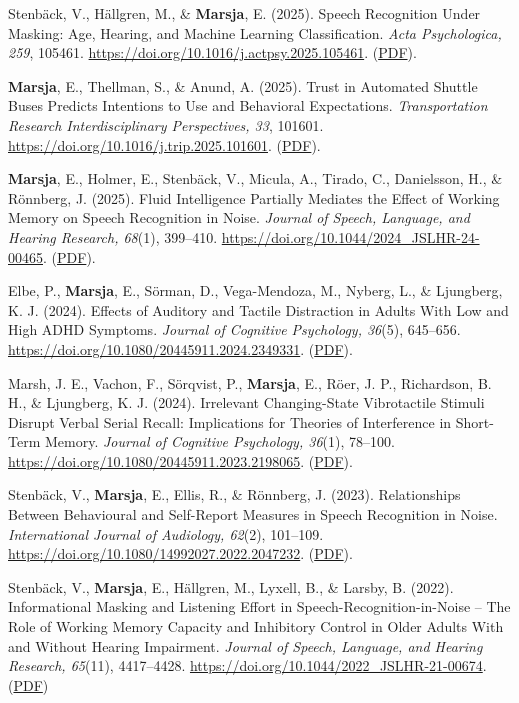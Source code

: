 \documentclass[]{article}
\begin{document}
Stenbäck, V., Hällgren, M., \& \textbf{Marsja}, E. (2025). Speech
Recognition Under Masking: Age, Hearing, and Machine Learning
Classification. \emph{Acta Psychologica, 259}, 105461.
\url{https://doi.org/10.1016/j.actpsy.2025.105461}.
(\href{https://tinyurl.com/spinml}{PDF}).

\textbf{Marsja}, E., Thellman, S., \& Anund, A. (2025). Trust in
Automated Shuttle Buses Predicts Intentions to Use and Behavioral
Expectations. \emph{Transportation Research Interdisciplinary
Perspectives, 33}, 101601.
\url{https://doi.org/10.1016/j.trip.2025.101601}.
(\href{https://tinyurl.com/trusttrip}{PDF}).

\textbf{Marsja}, E., Holmer, E., Stenbäck, V., Micula, A., Tirado, C.,
Danielsson, H., \& Rönnberg, J. (2025). Fluid Intelligence Partially
Mediates the Effect of Working Memory on Speech Recognition in Noise.
\emph{Journal of Speech, Language, and Hearing Research, 68}(1),
399--410. \url{https://doi.org/10.1044/2024_JSLHR-24-00465}.
(\href{https://tinyurl.com/gfspin}{PDF}).

Elbe, P., \textbf{Marsja}, E., Sörman, D., Vega-Mendoza, M., Nyberg, L.,
\& Ljungberg, K. J. (2024). Effects of Auditory and Tactile Distraction
in Adults With Low and High ADHD Symptoms. \emph{Journal of Cognitive
Psychology, 36}(5), 645--656.
\url{https://doi.org/10.1080/20445911.2024.2349331}.
(\href{https://tinyurl.com/elbevibra}{PDF}).

Marsh, J. E., Vachon, F., Sörqvist, P., \textbf{Marsja}, E., Röer, J.
P., Richardson, B. H., \& Ljungberg, K. J. (2024). Irrelevant
Changing-State Vibrotactile Stimuli Disrupt Verbal Serial Recall:
Implications for Theories of Interference in Short-Term Memory.
\emph{Journal of Cognitive Psychology, 36}(1), 78--100.
\url{https://doi.org/10.1080/20445911.2023.2198065}.
(\href{https://tinyurl.com/vibradistr}{PDF}).

Stenbäck, V., \textbf{Marsja}, E., Ellis, R., \& Rönnberg, J. (2023).
Relationships Between Behavioural and Self-Report Measures in Speech
Recognition in Noise. \emph{International Journal of Audiology, 62}(2),
101--109. \url{https://doi.org/10.1080/14992027.2022.2047232}.
(\href{https://tinyurl.com/IJA22}{PDF}).

Stenbäck, V., \textbf{Marsja}, E., Hällgren, M., Lyxell, B., \& Larsby,
B. (2022). Informational Masking and Listening Effort in
Speech-Recognition-in-Noise -- The Role of Working Memory Capacity and
Inhibitory Control in Older Adults With and Without Hearing Impairment.
\emph{Journal of Speech, Language, and Hearing Research, 65}(11),
4417--4428. \url{https://doi.org/10.1044/2022_JSLHR-21-00674}.
(\href{https://tinyurl.com/SPIN22b}{PDF})
\end{document}
